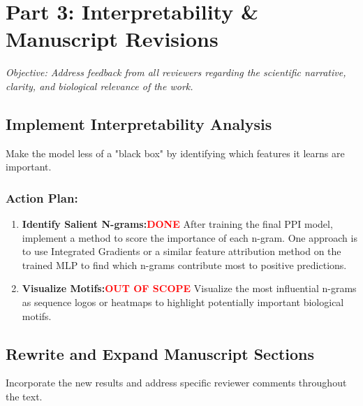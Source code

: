 \documentclass[11pt, a4paper]{article}
\begin{document}
	\section{Part 3: Interpretability \& Manuscript Revisions}
	\textit{Objective: Address feedback from all reviewers regarding the scientific narrative, clarity, and biological relevance of the work.}
	
	\subsection{Implement Interpretability Analysis}
	Make the model less of a "black box" by identifying which features it learns are important.
	\subsubsection*{Action Plan:}
	\begin{enumerate}
		\item \textbf{Identify Salient N-grams:\textcolor{red}{DONE}} After training the final PPI model, implement a method to score the importance of each n-gram. One approach is to use Integrated Gradients or a similar feature attribution method on the trained MLP to find which n-grams contribute most to positive predictions.
		\item \textbf{Visualize Motifs:\textcolor{red}{OUT OF SCOPE}} Visualize the most influential n-grams as sequence logos or heatmaps to highlight potentially important biological motifs.
	\end{enumerate}
	
	\subsection{Rewrite and Expand Manuscript Sections}
	Incorporate the new results and address specific reviewer comments throughout the text.
\end{document}
